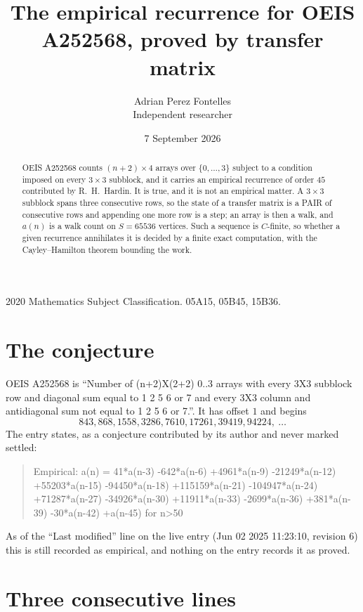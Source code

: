 \documentclass[11pt,a4paper]{article}
\title{The empirical recurrence for OEIS A252568, proved by transfer matrix}
\author{Adrian Perez Fontelles\\ \small Independent researcher}
\date{7 September 2026}
\theoremstyle{plain}
\theoremstyle{definition}
\begin{document}
\maketitle

\begin{abstract}
OEIS A252568 counts $(n+2)\times4$ arrays over $\{0,\dots,3\}$ subject to a condition imposed on
every $3\times3$ subblock, and it carries an empirical recurrence of order $45$
contributed by R.~H.~Hardin. It is true, and it is not an empirical matter. A $3\times3$
subblock spans three consecutive rows, so the state of a transfer matrix is a PAIR of
consecutive rows and appending one more row is a step; an array is then a walk, and
$a(n)$ is a walk count on $S=65536$ vertices. Such a sequence is $C$-finite, so whether a given
recurrence annihilates it is decided by a finite exact computation, with the Cayley--Hamilton
theorem bounding the work.
\end{abstract}

\noindent\small 2020 Mathematics Subject Classification. 05A15, 05B45, 15B36.\normalsize

\section{The conjecture}

OEIS A252568 is ``Number of (n+2)X(2+2) 0..3 arrays with every 3X3 subblock row and diagonal sum equal to 1 2 5 6 or 7 and every 3X3 column and antidiagonal sum not equal to 1 2 5 6 or 7.''. It has offset $1$ and begins
\[
843, 868, 1558, 3286, 7610, 17261, 39419, 94224,\ \dots
\]
The entry states, as a conjecture contributed by its author and never marked settled:
\begin{quote}
Empirical: a(n) = 41*a(n-3) -642*a(n-6) +4961*a(n-9) -21249*a(n-12) +55203*a(n-15) -94450*a(n-18) +115159*a(n-21) -104947*a(n-24) +71287*a(n-27) -34926*a(n-30) +11911*a(n-33) -2699*a(n-36) +381*a(n-39) -30*a(n-42) +a(n-45) for n>50
\end{quote}
As of the ``Last modified'' line on the live entry (Jun 02 2025 11:23:10, revision 6) this is still
recorded as empirical, and nothing on the entry records it as proved.

\section{Three consecutive lines}
\end{document}
